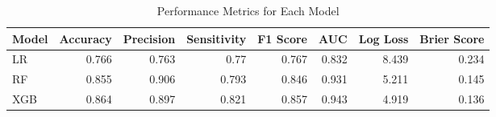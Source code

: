\begin{table}[H]\centering
\caption{Performance Metrics for Each Model}
\label{Table 3 :performance_metrics}
\begin{tabular}{lrrrrrrr}
\toprule
Model & Accuracy & Precision & Sensitivity & F1 Score & AUC & Log Loss & Brier Score \\
\midrule
LR & 0.766 & 0.763 & 0.77 & 0.767 & 0.832 & 8.439 & 0.234 \\
RF & 0.855 & 0.906 & 0.793 & 0.846 & 0.931 & 5.211 & 0.145 \\
XGB & 0.864 & 0.897 & 0.821 & 0.857 & 0.943 & 4.919 & 0.136 \\
\bottomrule
\end{tabular}
\end{table}
